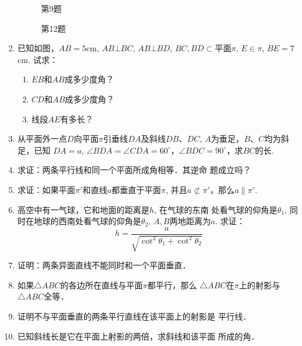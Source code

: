 \begin{enumerate}
\begin{figure}[htp]
\begin{minipage}[t]{0.48\textwidth}
\begin{tikzpicture}[>=latex, scale=1]
  \end{tikzpicture}
  \caption*{第9题}
  \end{minipage}
  \begin{minipage}[t]{0.48\textwidth}
  \centering
  \caption*{第12题}
  \end{minipage}
\end{figure}

\item 已知如图，$AB=5$cm, 
$AB\bot BC$, $AB\bot BD$, $BC,BD\subset $平面$\pi$, $E\in\pi$, $BE=7$cm. 试求：
\begin{enumerate}
  \item $EB$和$AB$成多少度角？
  \item $CD$和$AB$成多少度角？
  \item 线段$AE$有多长？
\end{enumerate}
\item 从平面外一点$D$向平面$\pi$引垂线$DA$及斜线$DB$、$DC$, 
$A$为垂足，$B$、$C$均为斜足，已知 $DA=a$, $\angle BDA=\angle CDA=60^{\circ}$，$\angle BDC=90^{\circ}$，求$BC$的长.
\item 求证：两条平行线和同一个平面所成角相等．其逆命
题成立吗？
\item 求证：如果平面$\pi'$和直线$a$都垂直于平面$\pi$, 并且$a\not\subset\pi'$，那么$a\parallel \pi'$.

\item 高空中有一气球，它和地面的距离是$h$, 在气球的东南
处看气球的仰角是$\theta_1$, 同时在地球的西南处看气球的仰角是$\theta_2$, $A,B$两地距离为$a$. 求证：
\[h=\frac{a}{\sqrt{\cot^2\theta_1+\cot^2\theta_2}}\]
\item 证明：两条异面直线不能同时和一个平面垂直．
\item 如果$\triangle ABC$的各边所在直线与平面$\pi$都平行，那么
$\triangle ABC$在$\pi$上的射影与$\triangle ABC$全等．
\item 证明不与平面垂直的两条平行直线在该平面上的射影是
平行线．
\item 已知斜线长是它在平面上射影的两倍，求斜线和该平面
所成的角．


\end{enumerate}
